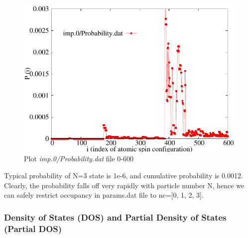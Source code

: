 \documentclass[12 pt]{article}
\begin{document}
\begin{itemize}
  \begin{figure}[ht]
    \centering
    \captionsetup{justification=centering}
    \caption{Plot \emph{imp.0/Probability.dat} file 0-600}
    \label{Plot imp.0/Probability.dat file 0-600}
    \vspace{2ex}
    \includegraphics[scale=0.8]{gnuplotProbability2}
  \end{figure}

  Typical probability of N=3 state is 1e-6, and cumulative probability is 0.0012. Clearly, the probability falls off 
very rapidly with particle number N, hence we can safely restrict occupancy in params.dat file to nc=[0, 1, 2, 3].

  \end{itemize}

  \cleardoublepage

	\subsubsection{\texorpdfstring{Density of States (DOS) and Partial Density of States\\ (Partial DOS)}{Density 
of States (DOS) and Partial Density of States(Partial DOS)}} 
\end{document}
